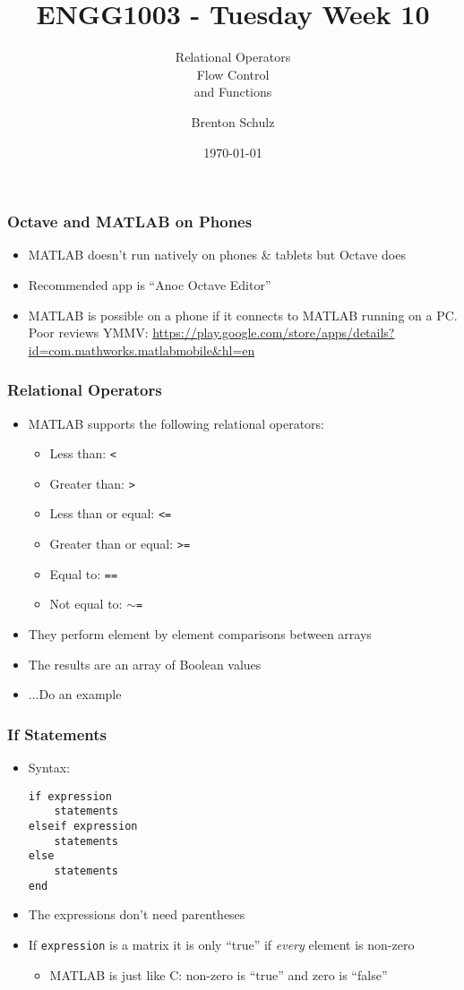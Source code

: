 \documentclass[14pt]{beamer}
\title{ENGG1003 - Tuesday Week 10}
\subtitle{Relational Operators\\Flow Control\\and Functions}
\author{Brenton Schulz}
\institute{University of Newcastle}
\date{\today}
\begin{document}
\titlepage

\begin{frame}
\frametitle{Octave and MATLAB on Phones}
\begin{itemize}
\item MATLAB doesn't run natively on phones \& tablets but Octave does
\item Recommended app is ``Anoc Octave Editor''
\item MATLAB is possible on a phone if it connects to MATLAB running on a PC. Poor reviews YMMV: \url{https://play.google.com/store/apps/details?id=com.mathworks.matlabmobile&hl=en}
\end{itemize}
\end{frame}

\begin{frame}
\frametitle{Relational Operators}
\begin{itemize}
\item MATLAB supports the following relational operators:
	\begin{itemize}
		\item Less than: \texttt{<}
		\item Greater than: \texttt{>}
		\item Less than or equal: \texttt{<=}
		\item Greater than or equal: \texttt{>=}
		\item Equal to: \texttt{==}
		\item Not equal to: \texttt{$\sim$=}
	\end{itemize}
\item They perform element by element comparisons between arrays
\item The results are an array of Boolean values
\item ...Do an example
\end{itemize}
\end{frame}

\begin{frame}[fragile]
\frametitle{If Statements}
\begin{itemize}
\item Syntax:
\begin{lstlisting}[style=pseudo]
if expression
    statements
elseif expression
    statements
else
    statements
end
\end{lstlisting}
\item The expressions don't need parentheses
\item If \texttt{expression} is a matrix it is only ``true'' if \textit{every} element is non-zero
	\begin{itemize}
		\item MATLAB is just like C: non-zero is ``true'' and zero is ``false''
	\end{itemize}
\end{itemize}
\end{frame}
\end{document}
